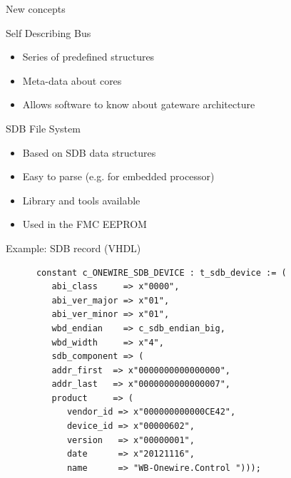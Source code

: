 \documentclass[compress,red]{beamer}
\begin{document}
\begin{frame}{New concepts}

  \begin{block}{Self Describing Bus}
    \begin{itemize}
    \item Series of predefined structures
    \item Meta-data about cores
    \item Allows software to know about gateware architecture
    \end{itemize}
  \end{block}

  \begin{block}{SDB File System}
    \begin{itemize}
    \item Based on SDB data structures
    \item Easy to parse (e.g. for embedded processor)
    \item Library and tools available %
    \item Used in the FMC EEPROM
    \end{itemize}
  \end{block}

\end{frame}

\begin{frame}[fragile]{Example: SDB record (VHDL)}

  \small
    \begin{verbatim}
      constant c_ONEWIRE_SDB_DEVICE : t_sdb_device := (
         abi_class     => x"0000",
         abi_ver_major => x"01",
         abi_ver_minor => x"01",
         wbd_endian    => c_sdb_endian_big,
         wbd_width     => x"4",
         sdb_component => (
         addr_first  => x"0000000000000000",
         addr_last   => x"0000000000000007",
         product     => (
            vendor_id => x"000000000000CE42",
            device_id => x"00000602",
            version   => x"00000001",
            date      => x"20121116",
            name      => "WB-Onewire.Control ")));
    \end{verbatim}
    \normalsize

\end{frame}
\end{document}
